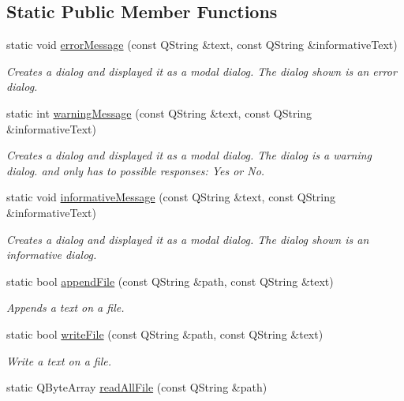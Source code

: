 \subsection*{Static Public Member Functions}
\begin{DoxyCompactItemize}
\item 
static void \mbox{\hyperlink{classUtils_ac24a694013a7415b517f63a0641a0fb6}{error\+Message}} (const Q\+String \&text, const Q\+String \&informative\+Text)
\begin{DoxyCompactList}\small\item\em Creates a dialog and displayed it as a modal dialog. The dialog shown is an error dialog. \end{DoxyCompactList}\item 
static int \mbox{\hyperlink{classUtils_a3ff1c4308ffae59e9cc2bec504a1448a}{warning\+Message}} (const Q\+String \&text, const Q\+String \&informative\+Text)
\begin{DoxyCompactList}\small\item\em Creates a dialog and displayed it as a modal dialog. The dialog is a warning dialog. and only has to possible responses\+: Yes or No. \end{DoxyCompactList}\item 
static void \mbox{\hyperlink{classUtils_aeb00036fda3bd7faa92e805579fffa3e}{informative\+Message}} (const Q\+String \&text, const Q\+String \&informative\+Text)
\begin{DoxyCompactList}\small\item\em Creates a dialog and displayed it as a modal dialog. The dialog shown is an informative dialog. \end{DoxyCompactList}\item 
static bool \mbox{\hyperlink{classUtils_a77efde99fa16c21245f66273c7fded3a}{append\+File}} (const Q\+String \&path, const Q\+String \&text)
\begin{DoxyCompactList}\small\item\em Appends a text on a file. \end{DoxyCompactList}\item 
static bool \mbox{\hyperlink{classUtils_ae41ebd024526737fbaaada06e229b3c5}{write\+File}} (const Q\+String \&path, const Q\+String \&text)
\begin{DoxyCompactList}\small\item\em Write a text on a file. \end{DoxyCompactList}\item 
static Q\+Byte\+Array \mbox{\hyperlink{classUtils_a8ab4445ab51c372f969d3088ef0b73d9}{read\+All\+File}} (const Q\+String \&path)

\end{DoxyCompactItemize}
